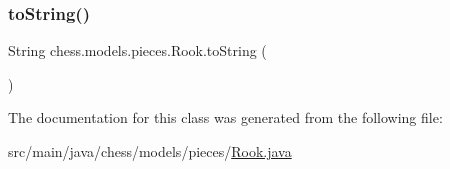 \subsubsection{\texorpdfstring{to\+String()}{toString()}}
{\footnotesize\ttfamily String chess.\+models.\+pieces.\+Rook.\+to\+String (\begin{DoxyParamCaption}{ }\end{DoxyParamCaption})}



The documentation for this class was generated from the following file\+:\begin{DoxyCompactItemize}
\item 
src/main/java/chess/models/pieces/\mbox{\hyperlink{_rook_8java}{Rook.\+java}}\end{DoxyCompactItemize}
